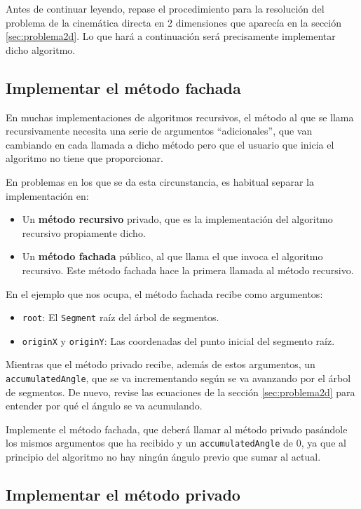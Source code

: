 \documentclass[10pt,a4paper,spanish]{article}
\newcommand{\code}[1]{\texttt{#1}}
\begin{document}
Antes de continuar leyendo, repase el procedimiento para la resolución del problema de la cinemática directa en 2 dimensiones que aparecía en la sección \ref{sec:problema2d}. Lo que hará a continuación será precisamente implementar dicho algoritmo.

\subsection{Implementar el método fachada}

En muchas implementaciones de algoritmos recursivos, el método al que se llama recursivamente necesita una serie de argumentos ``adicionales'', que van cambiando en cada llamada a dicho método pero que el usuario que inicia el algoritmo no tiene que proporcionar.

En problemas en los que se da esta circunstancia, es habitual separar la implementación en:

\begin{itemize}
    \item Un \textbf{método recursivo} privado, que es la implementación del algoritmo recursivo propiamente dicho.
    \item Un \textbf{método fachada} público, al que llama el que invoca el algoritmo recursivo. Este método fachada hace la primera llamada al método recursivo.
\end{itemize}

En el ejemplo que nos ocupa, el método fachada recibe como argumentos:

\begin{itemize}
    \item \code{root}: El \code{Segment} raíz del árbol de segmentos.
    \item \code{originX} y \code{originY}: Las coordenadas del punto inicial del segmento raíz.
\end{itemize}

Mientras que el método privado recibe, además de estos argumentos, un \code{accumulatedAngle}, que se va incrementando según se va avanzando por el árbol de segmentos. De nuevo, revise las ecuaciones de la sección \ref{sec:problema2d} para entender por qué el ángulo se va acumulando.

Implemente el método fachada, que deberá llamar al método privado pasándole los mismos argumentos que ha recibido y un \code{accumulatedAngle} de 0, ya que al principio del algoritmo no hay ningún ángulo previo que sumar al actual.

\subsection{Implementar el método privado}
\end{document}

